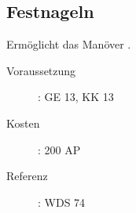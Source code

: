 \subsection{Festnageln}
\label{sf.festnageln}
Ermöglicht das Manöver .
\begin{description}
    \item[Voraussetzung]:
        GE 13, KK 13
    \item [Kosten]:
        200 AP
    \item [Referenz]:
        WDS 74
\end{description}
